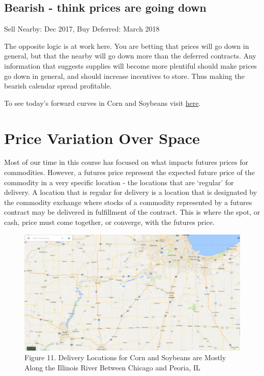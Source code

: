 \documentclass[
  letterpaper,
  DIV=11,
  numbers=noendperiod]{scrreprt}
\begin{document}
\hypertarget{bearish---think-prices-are-going-down}{%
\subsection{Bearish - think prices are going
down}\label{bearish---think-prices-are-going-down}}

Sell Nearby: Dec 2017, Buy Deferred: March 2018

The opposite logic is at work here. You are betting that prices will go
down in general, but that the nearby will go down more than the deferred
contracts. Any information that suggests supplies will become more
plentiful should make prices go down in general, and should increase
incentives to store. Thus making the bearish calendar spread profitable.

To see today's forward curves in Corn and Soybeans visit
\href{https://mindymallory.shinyapps.io/ForwardCurves/}{here}.

\hypertarget{price-variation-over-space}{%
\section{Price Variation Over Space}\label{price-variation-over-space}}

Most of our time in this course has focused on what impacts futures
prices for commodities. However, a futures price represent the expected
future price of the commodity in a very specific location - the
locations that are `regular' for delivery. A location that is regular
for delivery is a location that is designated by the commodity exchange
where stocks of a commodity represented by a futures contract may be
delivered in fulfillment of the contract. This is where the spot, or
cash, price must come together, or converge, with the futures price.

\begin{figure}

{\centering \includegraphics{images/IL-River.png}

}

\caption{Figure 11. Delivery Locations for Corn and Soybeans are Mostly
Along the Illinois River Between Chicago and Peoria, IL}

\end{figure}
\end{document}
